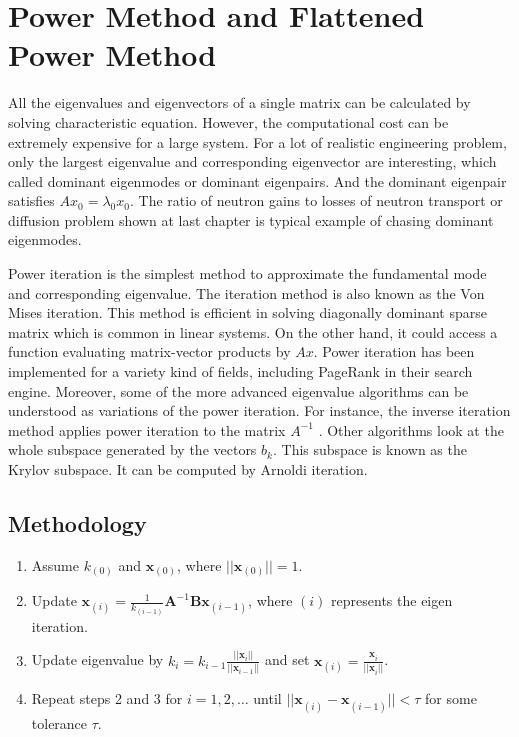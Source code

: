 \cleardoublepage

\chapter{Power Method and Flattened Power Method}

All the eigenvalues and eigenvectors of a single matrix can be calculated by solving characteristic equation.
However, the computational cost can be extremely expensive for a large system. 
For a lot of realistic engineering problem, only the largest eigenvalue and corresponding eigenvector are interesting, which called dominant eigenmodes or dominant eigenpairs.
And the dominant eigenpair satisfies $Ax_0 = \lambda_0 x_0$.
The ratio of neutron gains to losses of neutron transport or diffusion problem shown at last chapter is typical example of chasing dominant eigenmodes.

Power iteration is the simplest method to approximate the fundamental mode and corresponding eigenvalue. 
The iteration method is also known as the Von Mises iteration. 
This method is efficient in solving diagonally dominant sparse matrix which is common in linear systems.
On the other hand, it could access a function evaluating matrix-vector products by $Ax$.
Power iteration has been implemented for a variety kind of fields, including PageRank in their search engine.
Moreover, some of the more advanced eigenvalue algorithms can be understood as variations of the power iteration. 
For instance, the inverse iteration method applies power iteration to the matrix $A^{-1}$ . 
Other algorithms look at the whole subspace generated by the vectors $b_{k}$. 
This subspace is known as the Krylov subspace.
It can be computed by Arnoldi iteration.
\section{Methodology}
\begin{enumerate}
  \item Assume $k_{(0)}$ and $\mathbf{x}_{(0)}$, where $||\mathbf{x}_{(0)}||=1$.
  \item Update $\mathbf{x}_{(i)} = \frac{1}{k_{(i-1)}} \mathbf{A}^{-1} \mathbf{B} \mathbf{x}_{(i-1)}$, where $(i)$ represents the eigen iteration.
  \item Update eigenvalue by  $k_{i} = k_{i-1} \frac{||\mathbf{x}_{i}||}{||\mathbf{x}_{i-1}||}$ and set  $\mathbf{x}_{(i)} =\frac{\mathbf{x}^{}_{i}}{||\mathbf{x}^{}_{i}||}$.
  \item Repeat steps 2 and 3 for $i = 1, 2, \ldots$ until $||\mathbf{x}^{}_{(i)} - \mathbf{x}^{}_{(i-1)}|| < \tau$ for some tolerance $\tau$.
\end{enumerate}


